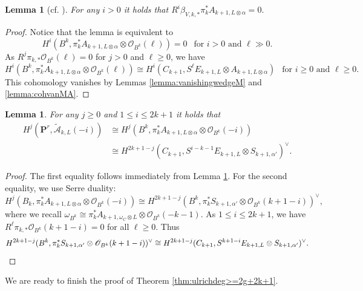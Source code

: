 \documentclass[12pt]{amsart}
\newcounter{thmcounter}
\numberwithin{equation}{section}
\numberwithin{thmcounter}{section}
\newtheorem{lemma}[thmcounter]{Lemma}
\theoremstyle{definition}
\theoremstyle{claim}
\newcommand{\nP}{\mathbf{P}}
\newcommand{\sO}{\mathscr{O}}
\begin{document}
\begin{lemma}[{cf. \cite[Theorem 5.2 (2)]{ENP}}]\label{lemma:DuBois-like-cond}
For any $i>0$ it holds that
$
R^i \beta_{V,k,*} \pi_k^*A_{k+1, L \otimes \alpha} = 0.
$
\end{lemma}


\begin{proof}
Notice that the lemma is equivalent to
$$
H^i(B^k, \pi_k^* A_{k+1, L \otimes \alpha} \otimes \sO_{B^k}(\ell)) = 0~~\text{ for $i>0$ and $\ell \gg 0$}.
$$
As $R^j \pi_{k,*}\sO_{B^k}(\ell) = 0$ for $j > 0$ and $\ell \geq 0$, we have
$$
H^i(B^k, \pi_k^* A_{k+1, L \otimes \alpha} \otimes \sO_{B^k}(\ell)) \cong H^i(C_{k+1}, S^{\ell} E_{k+1, L} \otimes A_{k+1, L \otimes \alpha})~~\text{ for $i \geq 0$ and $\ell \geq 0$.}
$$
This cohomology vanishes by  Lemmas \ref{lemma:vanishingwedgeM} and \ref{lemma:cohvanMA}.
\end{proof}


\begin{lemma}\label{lemma:cohfromBtoC}
For any $j\geq 0$ and $1\leq i\leq 2k+1$ it holds that
\begin{align*}
H^j(\nP^r, \widetilde{\mathscr{A}}_{k,L}(-i)) &\cong H^j(B^k, \pi_k^*A_{k+1, L \otimes \alpha} \otimes \sO_{B^k}(-i))\\
& \cong H^{2k+1-j}(C_{k+1},S^{i-k-1}E_{k+1,L}\otimes S_{k+1,\alpha'} )^{\vee}.
\end{align*}
\end{lemma}

\begin{proof}
The first equality  follows immediately from Lemma \ref{lemma:DuBois-like-cond}. For the second equality, we use  Serre duality:
$$
H^j(B_k, \pi_k^*A_{k+1, L \otimes \alpha} \otimes \sO_{B^k}(-i)) \cong H^{2k+1-j}(B^k, \pi_k^* S_{k+1,\alpha'} \otimes \sO_{B^k}(k+1-i))^{\vee},
$$
where we recall $\omega_{B^k} \cong \pi_k^* A_{k+1, \omega_C \otimes L} \otimes \sO_{B^{k}}(-k-1)$.
As $1 \leq i \leq 2k+1$, we have $R^{\ell} \pi_{k,*} \sO_{B^k}(k+1-i) = 0$ for all $\ell \geq 0$. Thus
\[
H^{2k+1-j}(B^k, \pi_k^* S_{k+1,\alpha'} \otimes \sO_{B^k}(k+1-i))^{\vee}
\cong H^{2k+1-j}(C_{k+1}, S^{k+1-i} E_{k+1,L} \otimes S_{k+1,\alpha'})^{\vee}. \qedhere
\]
\end{proof}




We are ready to finish the proof of Theorem \ref{thm:ulrichdeg>=2g+2k+1}.
\end{document}
